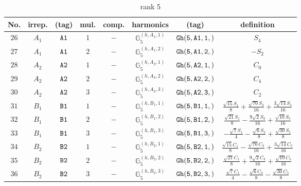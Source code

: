 \documentclass[fleqn,8pt]{jsarticle}
\begin{document}
\begin{table}[ht!]
\begin{center}
\caption{rank 5}
\renewcommand{\arraystretch}{1.3}
\begin{tabular}{cccccccc} \hline \hline
No. & irrep. & (tag) & mul. & comp. & harmonics & (tag) & definition \\ \hline
$ 26 $ & $ A_{1} $ & $ {\tt A1} $ & $ 1 $ & $ - $ & $ \mathbb{G}_{5}^{(h,A_{1},1)} $ & $ {\tt Gh(5,A1,1,)} $ & $ S_{4} $ \\
$ 27 $ & $ A_{1} $ & $ {\tt A1} $ & $ 2 $ & $ - $ & $ \mathbb{G}_{5}^{(h,A_{1},2)} $ & $ {\tt Gh(5,A1,2,)} $ & $ - S_{2} $ \\
$ 28 $ & $ A_{2} $ & $ {\tt A2} $ & $ 1 $ & $ - $ & $ \mathbb{G}_{5}^{(h,A_{2},1)} $ & $ {\tt Gh(5,A2,1,)} $ & $ C_{0} $ \\
$ 29 $ & $ A_{2} $ & $ {\tt A2} $ & $ 2 $ & $ - $ & $ \mathbb{G}_{5}^{(h,A_{2},2)} $ & $ {\tt Gh(5,A2,2,)} $ & $ C_{4} $ \\
$ 30 $ & $ A_{2} $ & $ {\tt A2} $ & $ 3 $ & $ - $ & $ \mathbb{G}_{5}^{(h,A_{2},3)} $ & $ {\tt Gh(5,A2,3,)} $ & $ C_{2} $ \\
$ 31 $ & $ B_{1} $ & $ {\tt B1} $ & $ 1 $ & $ - $ & $ \mathbb{G}_{5}^{(h,B_{1},1)} $ & $ {\tt Gh(5,B1,1,)} $ & $ \frac{\sqrt{15} S_{1}}{8} + \frac{\sqrt{70} S_{3}}{16} + \frac{3 \sqrt{14} S_{5}}{16} $ \\
$ 32 $ & $ B_{1} $ & $ {\tt B1} $ & $ 2 $ & $ - $ & $ \mathbb{G}_{5}^{(h,B_{1},2)} $ & $ {\tt Gh(5,B1,2,)} $ & $ \frac{\sqrt{21} S_{1}}{8} - \frac{9 \sqrt{2} S_{3}}{16} + \frac{\sqrt{10} S_{5}}{16} $ \\
$ 33 $ & $ B_{1} $ & $ {\tt B1} $ & $ 3 $ & $ - $ & $ \mathbb{G}_{5}^{(h,B_{1},3)} $ & $ {\tt Gh(5,B1,3,)} $ & $ - \frac{\sqrt{7} S_{1}}{4} - \frac{\sqrt{6} S_{3}}{8} + \frac{\sqrt{30} S_{5}}{8} $ \\
$ 34 $ & $ B_{2} $ & $ {\tt B2} $ & $ 1 $ & $ - $ & $ \mathbb{G}_{5}^{(h,B_{2},1)} $ & $ {\tt Gh(5,B2,1,)} $ & $ \frac{\sqrt{15} C_{1}}{8} - \frac{\sqrt{70} C_{3}}{16} + \frac{3 \sqrt{14} C_{5}}{16} $ \\
$ 35 $ & $ B_{2} $ & $ {\tt B2} $ & $ 2 $ & $ - $ & $ \mathbb{G}_{5}^{(h,B_{2},2)} $ & $ {\tt Gh(5,B2,2,)} $ & $ \frac{\sqrt{21} C_{1}}{8} + \frac{9 \sqrt{2} C_{3}}{16} + \frac{\sqrt{10} C_{5}}{16} $ \\
$ 36 $ & $ B_{2} $ & $ {\tt B2} $ & $ 3 $ & $ - $ & $ \mathbb{G}_{5}^{(h,B_{2},3)} $ & $ {\tt Gh(5,B2,3,)} $ & $ \frac{\sqrt{7} C_{1}}{4} - \frac{\sqrt{6} C_{3}}{8} - \frac{\sqrt{30} C_{5}}{8} $ \\
 \hline \hline
\end{tabular}
\end{center}
\end{table}
\end{document}
